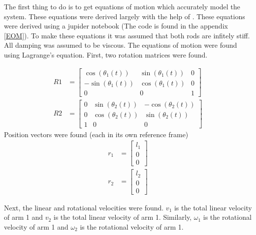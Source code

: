 \documentclass[letterpaper,10pt,oneside]{article}
\begin{document}
The first thing to do is to get equations of motion which accurately model the system. These equations were derived largely with the help of \cite{DYNAMICS}. These equations were derived using a jupider notebook (The code is found in the appendix \ref{EOM}). To make these equations it was assumed that both rods are infitely stiff. All damping was assumed to be viscous. The equations of motion were found using Lagrange’s equation. First, two rotation matrices were found.

\begin{align}
  R1 &= \left[\begin{matrix}
  \cos{\left(\theta_{1}{\left(t \right)} \right)} & \sin{\left(\theta_{1}{\left(t \right)} \right)} & 0 \\
  - \sin{\left(\theta_{1}{\left(t \right)} \right)} & \cos{\left(\theta_{1}{\left(t \right)} \right)} & 0 \\
  0 & 0 & 1
  \end{matrix}\right] \\
  R2 &= \left[\begin{matrix}
  0 & \sin{\left(\theta_{2}{\left(t \right)} \right)} & - \cos{\left(\theta_{2}{\left(t \right)} \right)} \\
  0 & \cos{\left(\theta_{2}{\left(t \right)} \right)} & \sin{\left(\theta_{2}{\left(t \right)} \right)} \\
  1 & 0 & 0
  \end{matrix}\right]
\end{align}
Position vectors were found (each in its own reference frame)
\begin{align}
  r_{1} &=
  \left[\begin{matrix}
  l_{1} \\
  0 \\
  0
  \end{matrix}\right] \\
  r_{2} &=
  \left[\begin{matrix}
  l_{2} \\
  0 \\
  0
  \end{matrix}\right]
\end{align}


Next, the linear and rotational velocities were found. $v_{1}$ is the total linear velocity of arm 1 and $v_{2}$ is the total linear velocity of arm 1. Similarly, $\omega_{1}$ is the rotational velocity of arm 1 and $\omega_{2}$ is the rotational velocity of arm 1.
\end{document}
